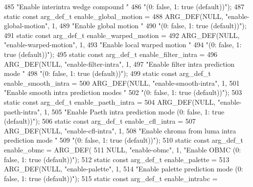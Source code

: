 \begin{DoxyCodeInclude}
{{{{{{{485             \textcolor{stringliteral}{"Enable interintra wedge compound "}
486             \textcolor{stringliteral}{"(0: false, 1: true (default))"});
487 \textcolor{keyword}{static} \textcolor{keyword}{const} arg\_def\_t enable\_global\_motion =
488     ARG\_DEF(NULL, \textcolor{stringliteral}{"enable-global-motion"}, 1,
489             \textcolor{stringliteral}{"Enable global motion "}
490             \textcolor{stringliteral}{"(0: false, 1: true (default))"});
491 \textcolor{keyword}{static} \textcolor{keyword}{const} arg\_def\_t enable\_warped\_motion =
492     ARG\_DEF(NULL, \textcolor{stringliteral}{"enable-warped-motion"}, 1,
493             \textcolor{stringliteral}{"Enable local warped motion "}
494             \textcolor{stringliteral}{"(0: false, 1: true (default))"});
495 \textcolor{keyword}{static} \textcolor{keyword}{const} arg\_def\_t enable\_filter\_intra =
496     ARG\_DEF(NULL, \textcolor{stringliteral}{"enable-filter-intra"}, 1,
497             \textcolor{stringliteral}{"Enable filter intra prediction mode "}
498             \textcolor{stringliteral}{"(0: false, 1: true (default))"});
499 \textcolor{keyword}{static} \textcolor{keyword}{const} arg\_def\_t enable\_smooth\_intra =
500     ARG\_DEF(NULL, \textcolor{stringliteral}{"enable-smooth-intra"}, 1,
501             \textcolor{stringliteral}{"Enable smooth intra prediction modes "}
502             \textcolor{stringliteral}{"(0: false, 1: true (default))"});
503 \textcolor{keyword}{static} \textcolor{keyword}{const} arg\_def\_t enable\_paeth\_intra =
504     ARG\_DEF(NULL, \textcolor{stringliteral}{"enable-paeth-intra"}, 1,
505             \textcolor{stringliteral}{"Enable Paeth intra prediction mode (0: false, 1: true (default))"});
506 \textcolor{keyword}{static} \textcolor{keyword}{const} arg\_def\_t enable\_cfl\_intra =
507     ARG\_DEF(NULL, \textcolor{stringliteral}{"enable-cfl-intra"}, 1,
508             \textcolor{stringliteral}{"Enable chroma from luma intra prediction mode "}
509             \textcolor{stringliteral}{"(0: false, 1: true (default))"});
510 \textcolor{keyword}{static} \textcolor{keyword}{const} arg\_def\_t enable\_obmc = ARG\_DEF(
511     NULL, \textcolor{stringliteral}{"enable-obmc"}, 1, \textcolor{stringliteral}{"Enable OBMC (0: false, 1: true (default))"});
512 \textcolor{keyword}{static} \textcolor{keyword}{const} arg\_def\_t enable\_palette =
513     ARG\_DEF(NULL, \textcolor{stringliteral}{"enable-palette"}, 1,
514             \textcolor{stringliteral}{"Enable palette prediction mode (0: false, 1: true (default))"});
515 \textcolor{keyword}{static} \textcolor{keyword}{const} arg\_def\_t enable\_intrabc =
}}}}}}}
\end{DoxyCodeInclude}

